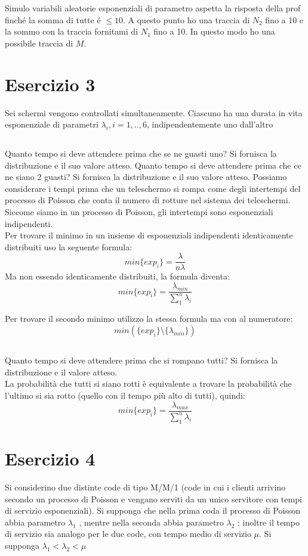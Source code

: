 \documentclass[a4paper]{article}
\begin{document}
Simulo variabili aleatorie esponenziali di parametro {{aspetta la risposta della prof}} finché la somma di tutte é $\leq 10$.
A questo punto ho una traccia di $N_2$ fino a 10 e la sommo con la traccia fornitami di $N_1$ fino a 10.
In questo modo ho una possibile traccia di $M$.

\section{Esercizio 3}
Sei schermi vengono controllati simultaneamente. Ciascuno ha una durata in vita esponenziale di parametri $\lambda_i , i = 1, .., 6$, indipendentemente uno dall’altro
\subsection{}
Quanto tempo si deve attendere prima che se ne guasti uno? Si fornisca la distribuzione e il suo valore atteso. Quanto tempo si deve attendere prima che ce ne siano 2 guasti? Si fornisca la distribuzione e il suo valore atteso.
Possiamo considerare i tempi prima che un teleschermo si rompa come degli intertempi del processo di Poisson che conta il numero di rotture nel sistema dei teleschermi.
Siccome siamo in un processo di Poisson, gli intertempi sono esponenziali indipendenti.\\
Per trovare il minimo in un insieme di esponenziali indipendenti identicamente distribuiti uso la seguente formula:
$$min\{exp_i\}= \frac{\lambda}{n \lambda}$$
Ma non essendo identicamente distribuiti, la formula diventa:
$$min\{exp_i\}= \frac{\lambda_{min}}{\sum_1^n \lambda_i}$$

Per trovare il secondo minimo utilizzo la stessa formula ma con al numeratore:  
$$min(\{exp_i\}\setminus \{\lambda_{min}\}) $$

\subsection{}
Quanto tempo si deve attendere prima che si rompano tutti? Si fornisca la distribuzione e il valore atteso.\\

La probabilità che tutti si siano rotti è equivalente a trovare la probabilità che l'ultimo si sia rotto (quello con il tempo più alto di tutti), quindi:
$$min\{exp_i\}= \frac{\lambda_{max}}{\sum_1^n \lambda_i}$$




\section{Esercizio 4}
Si considerino due distinte code di tipo M/M/1 (code in cui i clienti arrivino secondo un processo di Poisson e vengano serviti da un unico servitore con tempi di servizio esponenziali).
Si supponga che nella prima coda il processo di Poisson abbia parametro $\lambda_1$ , mentre nella seconda abbia parametro $\lambda_2$ ; inoltre il tempo di servizio sia analogo per le due code, con tempo medio di servizio $\mu$. Si supponga $\lambda_1 < \lambda_2 < \mu$
\end{document}
